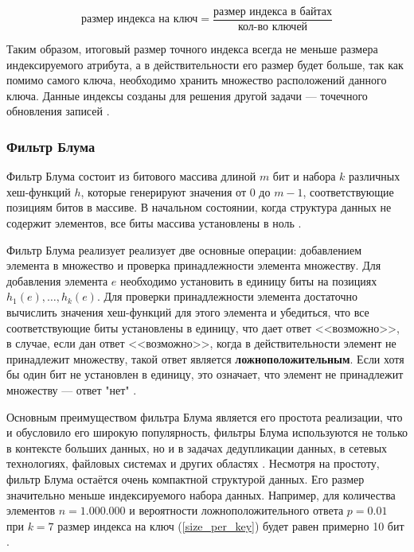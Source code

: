 \begin{equation}\label{size_per_key}
    \textrm{размер индекса на ключ} = \frac{\textrm{размер индекса в байтах}}{\textrm{кол-во ключей}}
\end{equation}

Таким образом, итоговый размер точного индекса всегда не меньше размера индексируемого атрибута, а в действительности его размер будет больше, так как помимо самого ключа, необходимо хранить множество расположений данного ключа. Данные индексы созданы для решения другой задачи --- точечного обновления записей \cite{Hudi_RLI}.

\subsubsection{Фильтр Блума} 

Фильтр Блума состоит из битового массива длиной $m$ бит и набора $k$ различных хеш-функций $h$, которые генерируют значения от $0$ до $m−1$, соответствующие позициям битов в массиве. В начальном состоянии, когда структура данных не содержит элементов, все биты массива установлены в ноль \cite{Bloom_Filter}.

Фильтр Блума реализует реализует две основные операции: добавлением элемента в множество и проверка принадлежности элемента множеству. Для добавления элемента $e$ необходимо установить в единицу биты на позициях $h_1(e), \dots, h_k(e)$. Для проверки принадлежности элемента достаточно вычислить значения хеш-функций для этого элемента и убедиться, что все соответствующие биты установлены в единицу, что дает ответ {<<возможно>>}, в случае, если дан ответ {<<возможно>>}, когда в действительности элемент не принадлежит множеству, такой ответ является \textbf{ложноположительным}. Если хотя бы один бит не установлен в единицу, это означает, что элемент не принадлежит множеству — ответ "нет" \cite{Bloom_Filter,Role_of_bloom_filter_in_big_data}.

Основным преимуществом фильтра Блума является его простота реализации, что и обусловило его широкую популярность, фильтры Блума используются не только в контексте больших данных, но и в задачах дедупликации данных, в сетевых технологиях, файловых системах и других областях \cite{Role_of_bloom_filter_in_big_data}. Несмотря на простоту, фильтр Блума остаётся очень компактной структурой данных. Его размер значительно меньше индексируемого набора данных. Например, для количества элементов $n = 1.000.000$ и вероятности ложноположительного ответа $p = 0.01$ при $k = 7$ размер индекса на ключ (\ref{size_per_key}) будет равен примерно 10 бит \cite{Bloom_Filter}.

